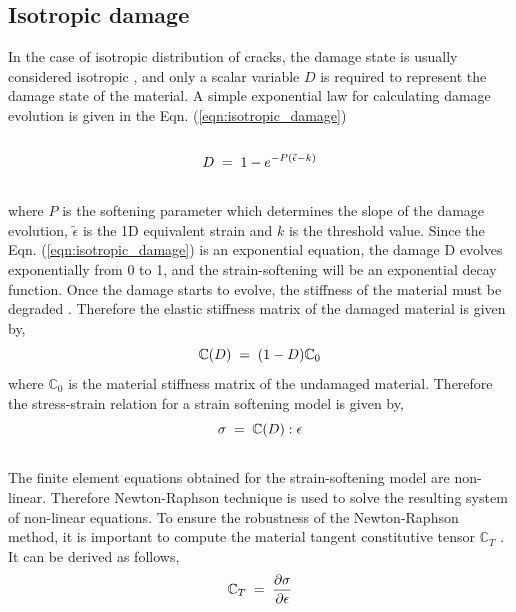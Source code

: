 \documentclass[12pt,a4paper,twoside,openright]{report}
\begin{document}
\subsection{Isotropic damage}
\indent\indent\indent In the case of isotropic distribution of cracks, the damage state is usually considered isotropic \citep{lemaitre2012course}, and only a scalar variable $D$ is required to represent the damage state of the material. A simple exponential law for calculating damage evolution is given in the Eqn. (\ref{eqn:isotropic_damage}) \citep{peerlings1999enhanced}
\\
\\
\begin{equation}
  \large{ D \; = \; 1 - e^{-P(\tilde{\epsilon} - k)}}
  \label{eqn:isotropic_damage}
\end{equation} 
\\
where $P$ is the softening parameter which determines the slope of the damage evolution, $\tilde{\epsilon}$ is the 1D equivalent strain and $k$ is the threshold value. Since the Eqn. (\ref{eqn:isotropic_damage}) is an exponential equation, the damage D evolves exponentially from 0 to 1, and the strain-softening will be an exponential decay function. Once the damage starts to evolve, the stiffness of the material must be degraded \citep{murakami2012continuum}. Therefore the elastic stiffness matrix of the damaged material is given by,\\
\begin{equation}
\large{\mathbb{C}(D) \; = \; (1  - D) \mathbb{C}_{0} }
\end{equation} 
where $\mathbb{C}_{0}$ is the material stiffness matrix of the undamaged material. Therefore the stress-strain relation for a strain softening model is given by,\\
\begin{equation}
\large{\sigma \; = \; \mathbb{C}(D) : \epsilon }  
\end{equation}
\\
The finite element equations obtained for the strain-softening model are non-linear. Therefore Newton-Raphson technique is used to solve the resulting system of non-linear equations. To ensure the robustness of the Newton-Raphson method, it is important to compute the material tangent constitutive tensor $\mathbb{C}_{T}$ \citep{lapczyk2007progressive}. It can be derived as follows,\\
\begin{equation*}
\large{ \mathbb{C}_{T}  \; = \;\frac{\partial \sigma}{\partial \epsilon}  }
\end{equation*}
\end{document}
